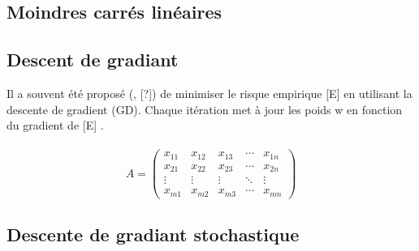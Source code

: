 	\subsection{Moindres carrés linéaires}
	\lipsum[1] %
	
	
	
	\subsection{Descent de gradiant}
	
	Il a souvent été proposé (\eg, [?]) de minimiser le risque empirique [E] en utilisant la descente de gradient (GD). Chaque itération met à jour les poids w en fonction du gradient de [E] \cite{bottou2012stochastic}.\\
	\lipsum[1] \\
	
	$$A = \begin{pmatrix}
	x_{11} & x_{12} & x_{13} & \cdots & x_{1n} \\
	x_{21} & x_{22} & x_{23} & \cdots & x_{2n} \\
	\vdots & \vdots & \vdots & \ddots & \vdots \\
	x_{m1} & x_{m2} & x_{m3} & \cdots & x_{mn}
	\end{pmatrix}$$
	
	
	\lipsum[4]
	
	\subsection{Descente de gradiant stochastique}
	\lipsum[1]

